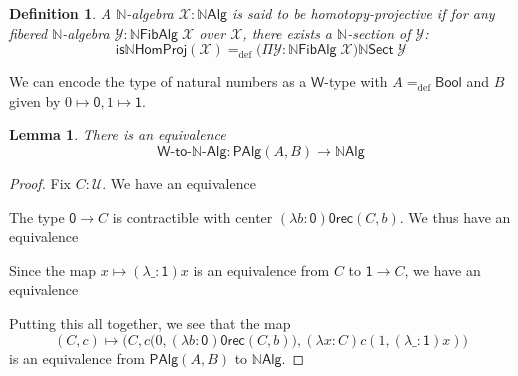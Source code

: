 \documentclass[10pt,a4paper,oneside,reqno]{amsart}
\numberwithin{equation}{section}
\theoremstyle{mythm}
\newtheorem{lemma}[theorem]{Lemma}
\theoremstyle{mydef}
\newtheorem{definition}[theorem]{Definition}
\theoremstyle{myrmk}
\newcommand{\defeq}{=_{\mathrm{def}}}
\newcommand{\U}{\mathcal{U}}
\newcommand{\prd}[1]{\Pi_{#1}}
\newcommand{\abort}{\mathsf{0rec}}
\newcommand{\nat}{\ensuremath{\mathbb{N}}}
\newcommand{\W}{\mathsf{W}}
\newcommand{\Bool}{\mathsf{Bool}}
\newcommand{\one}{\mathsf{1}}
\newcommand{\zero}{\mathsf{0}}
\newcommand{\NatAlg}{\nat\mathsf{Alg}}
\newcommand{\NatFibAlg}{\nat\mathsf{FibAlg}}
\newcommand{\NatFibHom}{\nat\mathsf{Sect}}
\newcommand{\IsNatHProj}{\mathsf{is}\nat\mathsf{HomProj}}
\newcommand{\WAlgToNatAlg}{\W\text{-}\mathsf{to}\text{-}\nat\text{-}\mathsf{Alg}}
\newcommand{\WAlg}{\mathsf{PAlg}}
\newcommand{\X}{\mathcal{X}}
\newcommand{\Y}{\mathcal{Y}}
\begin{document}
\begin{definition}\label{def:NatHProj}
A $\nat$-algebra $\X : \NatAlg$ is said to be \emph{homotopy-projective} if for any fibered $\nat$-algebra $\Y : \NatFibAlg \; \X$ over $\X$, there exists a $\nat$-section of $\Y$:
\[ \IsNatHProj(\X) \defeq \big(\Pi \Y:\NatFibAlg \; \X\big) \NatFibHom \; \Y \]  
\end{definition}

We can encode the type of natural numbers as a $\W$-type with $A \defeq \Bool$ and $B$ given by $0 \mapsto \zero, 1 \mapsto \one$. 
\begin{lemma}
There is an equivalence
\[ \WAlgToNatAlg : \WAlg(A,B) \to \NatAlg \]
\end{lemma}
\begin{proof}
Fix $C : \U$. We have an equivalence
\begin{center}
\end{center}
The type $\zero \to C$ is contractible with center $(\lambda b:\zero) \abort(C,b)$. We thus have an equivalence
\begin{center}
\end{center}
Since the map $x \mapsto (\lambda \_:\one)x$ is an equivalence from $C$ to $\one \to C$, we have an equivalence
\begin{center}
\end{center}
Putting this all together, we see that the map 
\[ (C,c) \mapsto \Big(C,c\big(0,(\lambda b:\zero) \abort(C,b)\big),(\lambda x:C) c(1, (\lambda \_:\one)x)\Big)\] 
is an equivalence from $\WAlg(A,B)$ to $\NatAlg$.
\end{proof}
\end{document}

